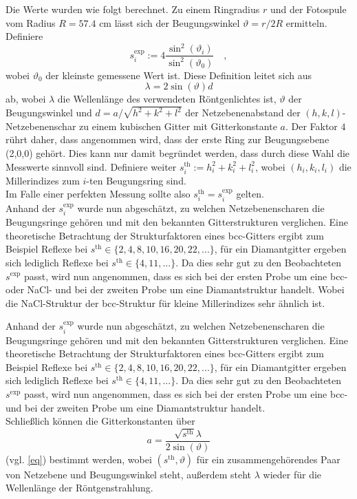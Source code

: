 Die Werte wurden wie folgt berechnet. Zu einem Ringradius $r$ und der Fotospule vom
Radius $R=57.4 \text{ cm}$ lässt sich der Beugungswinkel $\vartheta=r/2R$ ermitteln.
Definiere
\begin{equation}
s_i^\text{exp}:=4 \frac{\sin^2(\vartheta_i)}{\sin^2(\vartheta_0)} \quad ,
\end{equation}
wobei $\vartheta_0$ der kleinste gemessene Wert ist. Diese Definition leitet sich
aus
\begin{equation}
\lambda=2\sin(\vartheta) d \label{eq}
\end{equation}
ab, wobei $\lambda$ die Wellenlänge des verwendeten Röntgenlichtes ist, $\vartheta$ der Beugungswinkel und $d=a/\sqrt{h^2+k^2+l^2}$ der Netzebenenabstand der $(h,k,l)$-
Netzebenenschar zu einem kubischen Gitter mit Gitterkonstante $a$. Der Faktor $4$ rührt daher, dass angenommen wird, dass der erste Ring zur
Beugungsebene (2,0,0) gehört. Dies kann nur damit begründet werden, dass durch diese
Wahl die Messwerte sinnvoll sind.
Definiere weiter $s^\text{th}_i:=h_i^2+k_i^2+l_i^2$, wobei $(h_i,k_i,l_i)$ die
Millerindizes zum $i$-ten Beugungsring sind.\\
Im Falle einer perfekten Messung sollte also $s_i^\text{th}=s_i^\text{exp}$ gelten.
\\

Anhand der $s_i^\text{exp}$ wurde nun abgeschätzt, zu welchen Netzebenenscharen die 
Beugungsringe gehören und mit den bekannten Gitterstrukturen verglichen. Eine 
theoretische Betrachtung der Strukturfaktoren eines bcc-Gitters ergibt zum Beispiel 
Reflexe bei $s^\text{th} \in \{ 2,4,8,10,16,20,22,... \}$, für ein Diamantgitter 
ergeben sich lediglich Reflexe bei $s^\text{th}\in \{ 4,11,... \}$. Da dies sehr gut 
zu den Beobachteten $s^\text{exp}$ passt, wird nun angenommen, dass es sich bei der 
ersten Probe um eine bcc- oder NaCl- und bei der zweiten Probe um eine 
Diamantstruktur handelt. Wobei die NaCl-Struktur der bcc-Struktur für kleine 
Millerindizes sehr ähnlich ist.

Anhand der $s_i^\text{exp}$ wurde nun abgeschätzt, zu welchen Netzebenenscharen die
Beugungsringe gehören und mit den bekannten Gitterstrukturen verglichen. Eine
theoretische Betrachtung der Strukturfaktoren eines bcc-Gitters ergibt zum Beispiel
Reflexe bei $s^\text{th} \in \{ 2,4,8,10,16,20,22,... \}$, für ein Diamantgitter
ergeben sich lediglich Reflexe bei $s^\text{th}\in \{ 4,11,... \}$. Da dies sehr gut
zu den Beobachteten $s^\text{exp}$ passt, wird nun angenommen, dass es sich bei der
ersten Probe um eine bcc- und bei der zweiten Probe um eine Diamantstruktur handelt.
\\
Schließlich können die Gitterkonstanten über
\begin{equation}
a=\frac{\sqrt{s^\text{th}} \lambda}{2 \sin(\vartheta)}
\end{equation}
(vgl. \eqref{eq}) bestimmt werden, wobei $(s^\text{th},\vartheta)$ für ein
zusammengehörendes Paar von Netzebene und Beugungswinkel steht, außerdem steht
$\lambda$ wieder für die Wellenlänge der Röntgenstrahlung.

